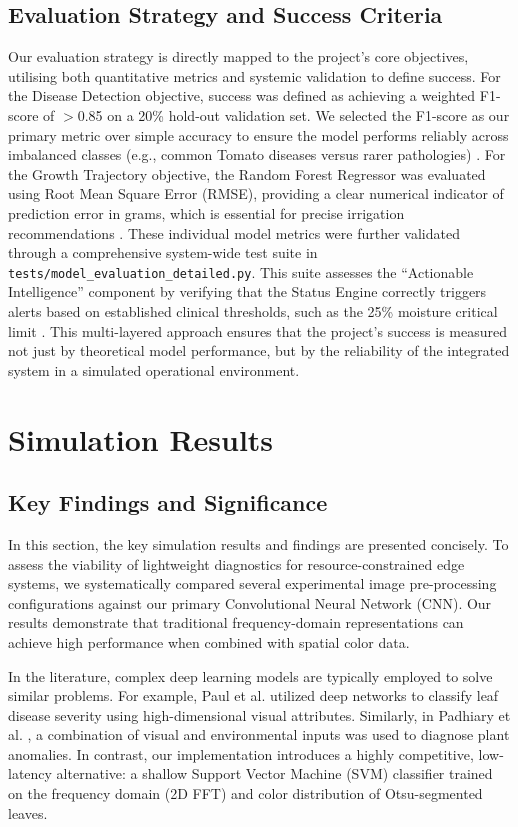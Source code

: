 \documentclass[11pt,a4paper]{article}
\begin{document}
\subsection{Evaluation Strategy and Success Criteria}
Our evaluation strategy is directly mapped to the project's core objectives, utilising both quantitative metrics and systemic validation to define success. For the Disease Detection objective, success was defined as achieving a weighted F1-score of $>$0.85 on a 20\% hold-out validation set. We selected the F1-score as our primary metric over simple accuracy to ensure the model performs reliably across imbalanced classes (e.g., common Tomato diseases versus rarer pathologies) \cite{av2024}. For the Growth Trajectory objective, the Random Forest Regressor was evaluated using Root Mean Square Error (RMSE), providing a clear numerical indicator of prediction error in grams, which is essential for precise irrigation recommendations \cite{khoshvaght2025}. These individual model metrics were further validated through a comprehensive system-wide test suite in \texttt{tests/model\_evaluation\_detailed.py}. This suite assesses the ``Actionable Intelligence'' component by verifying that the Status Engine correctly triggers alerts based on established clinical thresholds, such as the 25\% moisture critical limit \cite{umutoni2024}. This multi-layered approach ensures that the project’s success is measured not just by theoretical model performance, but by the reliability of the integrated system in a simulated operational environment.

\section{Simulation Results}\label{sec:findings}
\subsection{Key Findings and Significance}
In this section, the key simulation results and findings are presented concisely. To assess the viability of lightweight diagnostics for resource-constrained edge systems, we systematically compared several experimental image pre-processing configurations against our primary Convolutional Neural Network (CNN). Our results demonstrate that traditional frequency-domain representations can achieve high performance when combined with spatial color data.

In the literature, complex deep learning models are typically employed to solve similar problems. For example, Paul et al. \cite{paul2024} utilized deep networks to classify leaf disease severity using high-dimensional visual attributes. Similarly, in Padhiary et al. \cite{padhiary2024}, a combination of visual and environmental inputs was used to diagnose plant anomalies. In contrast, our implementation introduces a highly competitive, low-latency alternative: a shallow Support Vector Machine (SVM) classifier trained on the frequency domain (2D FFT) and color distribution of Otsu-segmented leaves.
\end{document}
